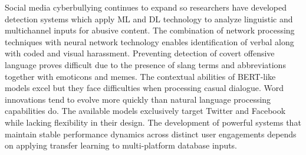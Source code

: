 Social media cyberbullying continues to expand so researchers have developed detection systems which apply ML and DL technology to analyze linguistic and multichannel inputs for abusive content. The combination of network processing techniques with neural network technology enables identification of verbal along with coded and visual harassment. Preventing detection of covert offensive language proves difficult due to the presence of slang terms and abbreviations together with emoticons and memes. The contextual abilities of BERT-like models excel but they face difficulties when processing casual dialogue. Word innovations tend to evolve more quickly than natural language processing capabilities do. The available models exclusively target Twitter and Facebook while lacking flexibility in their design. The development of powerful systems that maintain stable performance dynamics across distinct user engagements depends on applying transfer learning to multi-platform database inputs.






